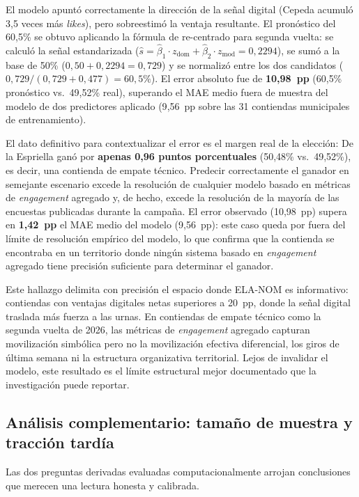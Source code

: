 El modelo apuntó correctamente la dirección de la señal digital (Cepeda acumuló 3{,}5 veces más \textit{likes}), pero sobreestimó la ventaja resultante. El pronóstico del 60{,}5\% se obtuvo aplicando la fórmula de re-centrado para segunda vuelta: se calculó la señal estandarizada ($\hat{s} = \hat{\beta}_1 \cdot z_{\text{dom}} + \hat{\beta}_2 \cdot z_{\text{mod}} = 0{,}2294$), se sumó a la base de 50\% ($0{,}50 + 0{,}2294 = 0{,}729$) y se normalizó entre los dos candidatos ($0{,}729 / (0{,}729 + 0{,}477) = 60{,}5\%$). El error absoluto fue de \textbf{10{,}98~pp} (60{,}5\% pronóstico vs.~49{,}52\% real), superando el MAE medio fuera de muestra del modelo de dos predictores aplicado (9{,}56~pp sobre las 31 contiendas municipales de entrenamiento).

El dato definitivo para contextualizar el error es el margen real de la elección: De la Espriella ganó por \textbf{apenas 0{,}96 puntos porcentuales} (50{,}48\% vs.~49{,}52\%), es decir, una contienda de empate técnico. Predecir correctamente el ganador en semejante escenario excede la resolución de cualquier modelo basado en métricas de \textit{engagement} agregado y, de hecho, excede la resolución de la mayoría de las encuestas publicadas durante la campaña. El error observado (10{,}98~pp) supera en \textbf{1{,}42~pp} el MAE medio del modelo (9{,}56~pp): este caso queda por fuera del límite de resolución empírico del modelo, lo que confirma que la contienda se encontraba en un territorio donde ningún sistema basado en \textit{engagement} agregado tiene precisión suficiente para determinar el ganador.

Este hallazgo delimita con precisión el espacio donde ELA-NOM es informativo: contiendas con ventajas digitales netas superiores a 20~pp, donde la señal digital traslada más fuerza a las urnas. En contiendas de empate técnico como la segunda vuelta de 2026, las métricas de \textit{engagement} agregado capturan movilización simbólica pero no la movilización efectiva diferencial, los giros de última semana ni la estructura organizativa territorial. Lejos de invalidar el modelo, este resultado es el límite estructural mejor documentado que la investigación puede reportar.

\subsection{Análisis complementario: tamaño de muestra y tracción tardía}

Las dos preguntas derivadas evaluadas computacionalmente arrojan conclusiones que merecen una lectura honesta y calibrada.

